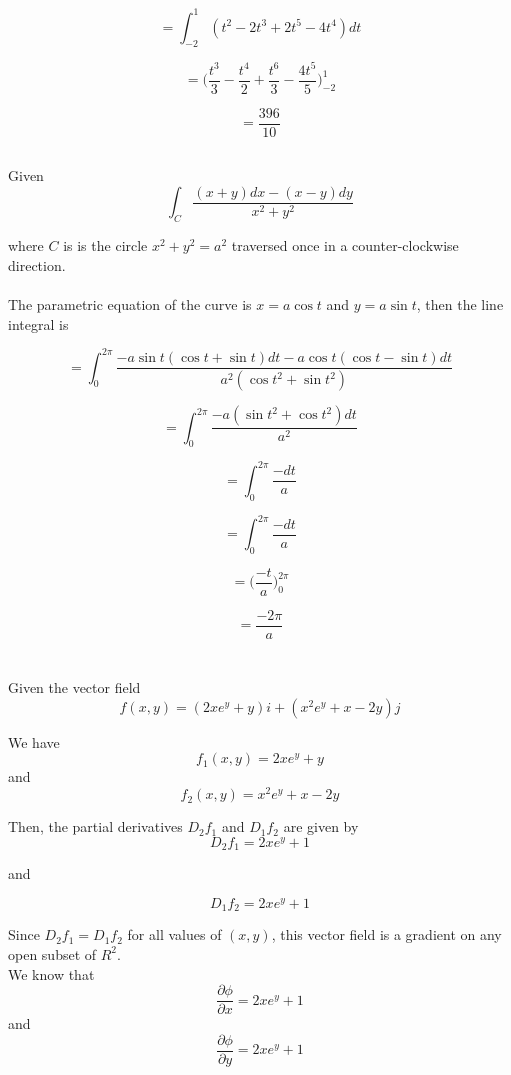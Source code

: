 \documentclass[11pt]{article}
\begin{document}
$$= \int_{-2}^{1}(t^{2} - 2t^{3} + 2t^{5} - 4t^{4})dt$$

$$= \Big(\frac{t^{3}}{3} - \frac{t^{4}}{2} + \frac{t^{6}}{3} - \frac{4t^{5}}{5}\Big)_{-2}^{1}$$

$$= \frac{396}{10}$$

\subsection{}

Given $$\int_{C}\frac{(x+y)dx - (x-y)dy}{x^{2} + y^{2}}$$

where $C$ is is the circle $x^{2} + y^{2} = a^{2}$ traversed once in a counter-clockwise direction.
\\
\\
The parametric equation of the curve is $x = a\cos{t}$ and $y = a\sin{t}$, then the line integral is

$$= \int_{0}^{2\pi}\frac{-a\sin{t}(\cos{t}+\sin{t})dt - a\cos{t}(\cos{t}-\sin{t})dt}{a^{2}({\cos{t}}^{2} + {\sin{t}}^{2})}$$

$$= \int_{0}^{2\pi}\frac{-a({\sin{t}}^{2} + {\cos{t}}^{2})dt}{a^{2}}$$

$$= \int_{0}^{2\pi}\frac{-dt}{a}$$

$$= \int_{0}^{2\pi}\frac{-dt}{a}$$

$$= \Big(\frac{-t}{a}\Big)_{0}^{2\pi}$$

$$= \frac{-2\pi}{a}$$
\section{}
\subsection{}
Given the vector field $$f(x, y) = (2xe^{y} + y)i + (x^{2}e^{y} + x − 2y)j$$

We have $$f_{1}(x,y) = 2xe^{y} + y$$ and $$f_{2}(x,y) = x^{2}e^{y} + x − 2y$$

Then, the partial derivatives $D_{2}f_{1}$ and $D_{1}f_{2}$ are given by
$$D_{2}f_{1} = 2xe^{y} + 1$$

and

$$D_{1}f_{2} = 2xe^{y} + 1$$

Since $D_{2}f_{1} = D_{1}f_{2}$ for all values of $(x,y)$, this vector field is a gradient on any open subset of $R^{2}$.
\\
We know that $$\frac{\partial \phi}{\partial x} = 2xe^{y} + 1$$ and $$\frac{\partial \phi}{\partial y} = 2xe^{y} + 1$$ 
\end{document}
